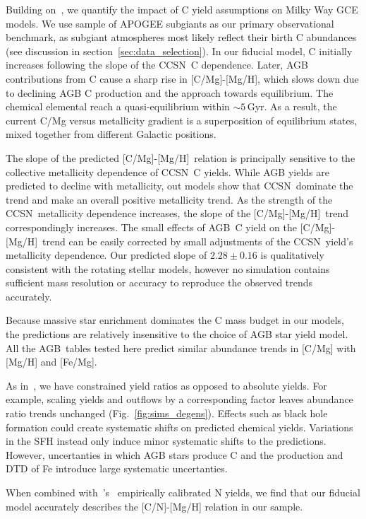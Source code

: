 \documentclass[fleqn,
referee, %
usenatbib]{mnras}
\makeatletter
\newcommand{\zetaibest}{2.28 \pm 0.16}
\newcommand{\agb}{AGB}
\newcommand{\cc}{CCSN}
\newcommand{\caah}{[C/Mg]-[Mg/H]}
\newcommand{\about}[1]{${\sim} #1$}
\DeclareRobustCommand\citepos
  {\begingroup
   \let\NAT@nmfmt\NAT@posfmt%
   \NAT@swafalse\let\NAT@ctype\z@\NAT@partrue
   \@ifstar{\NAT@fulltrue\NAT@citetp}{\NAT@fullfalse\NAT@citetp}}
\let\NAT@orig@nmfmt\NAT@nmfmt
\def\NAT@posfmt#1{\NAT@orig@nmfmt{#1's}}
\makeatother
\begin{document}
Building on~\citet{james+23}, we quantify the impact of C yield assumptions on Milky Way GCE models. We use \citepos{jack} sample of APOGEE subgiants as our primary observational benchmark, as subgiant atmospheres most likely reflect their birth C abundances (see discussion in section~\ref{sec:data_selection}).
In our fiducial model, C initially increases following the slope of the \cc\ C dependence. Later, AGB contributions from C cause a sharp rise in \caah, which slows down due to declining AGB C production and the approach towards equilibrium. The chemical elemental reach a quasi-equilibrium within \about{5}\,Gyr. As a result, the current C/Mg versus metallicity gradient is a superposition of equilibrium states, mixed together from different Galactic positions.


The slope of the predicted \caah\ relation is principally sensitive to the collective metallicity dependence of \cc\ C yields.
While AGB yields are predicted to decline with metallicity, out models show that \cc\ dominate the trend and make an overall positive metallicity trend. 
As the strength of the \cc\ metallicity dependence increases, the slope of the \caah\ trend correspondingly increases. The small effects of \agb\ C yield on the \caah\ trend can be easily corrected by small adjustments of the \cc\ yield's metallicity dependence.
Our predicted slope of $\zetaibest$ is qualitatively consistent with the \citet{LC18} rotating stellar models, however no simulation contains sufficient mass resolution or accuracy to reproduce the observed trends accurately. 

Because massive star enrichment dominates the C mass budget in our models, the predictions are relatively insensitive to the choice of AGB star yield model.
All the \agb\ tables tested here predict similar abundance trends in [C/Mg] with [Mg/H] and [Fe/Mg]. 

As in~\citet{james+23}, we have constrained yield ratios as opposed to absolute yields. For example, scaling yields and outflows by a corresponding factor leaves abundance ratio trends unchanged (Fig.~\ref{fig:sims_degens}).  Effects such as black hole formation could create systematic shifts on predicted chemical yields.
Variations in the SFH instead only induce minor systematic shifts to the predictions. However, uncertanties in which AGB stars produce C and the production and DTD of Fe introduce large systematic uncertanties.


When combined with~\citeauthor{james+23}'s~\citeyearpar{james+23} empirically calibrated N yields, we find that our fiducial model accurately describes the [C/N]-[Mg/H] relation in our sample. 
\end{document}
